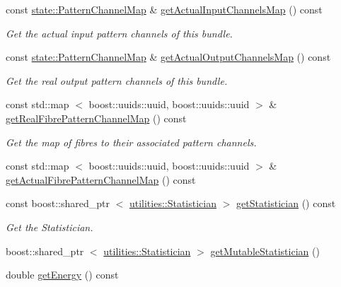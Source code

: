 \begin{DoxyCompactItemize}
const \hyperlink{classcryomesh_1_1state_1_1PatternChannelMap}{state\-::\-Pattern\-Channel\-Map} \& \hyperlink{classcryomesh_1_1structures_1_1Bundle_a65bf0246390e7cb0e90caf4fb302fa41}{get\-Actual\-Input\-Channels\-Map} () const 
\begin{DoxyCompactList}\small\item\em \-Get the actual input pattern channels of this bundle. \end{DoxyCompactList}\item 
const \hyperlink{classcryomesh_1_1state_1_1PatternChannelMap}{state\-::\-Pattern\-Channel\-Map} \& \hyperlink{classcryomesh_1_1structures_1_1Bundle_a382242e3b29b92b25edc9162aa810ebe}{get\-Actual\-Output\-Channels\-Map} () const 
\begin{DoxyCompactList}\small\item\em \-Get the real output pattern channels of this bundle. \end{DoxyCompactList}\item 
const std\-::map\*
$<$ boost\-::uuids\-::uuid, \*
boost\-::uuids\-::uuid $>$ \& \hyperlink{classcryomesh_1_1structures_1_1Bundle_a2e31be3bab4a15e4e9ba6aeac48b91df}{get\-Real\-Fibre\-Pattern\-Channel\-Map} () const 
\begin{DoxyCompactList}\small\item\em \-Get the map of fibres to their associated pattern channels. \end{DoxyCompactList}\item 
const std\-::map\*
$<$ boost\-::uuids\-::uuid, \*
boost\-::uuids\-::uuid $>$ \& \hyperlink{classcryomesh_1_1structures_1_1Bundle_a872de96a76f772182eda2abbb98a99cc}{get\-Actual\-Fibre\-Pattern\-Channel\-Map} () const 
\item 
const boost\-::shared\-\_\-ptr\*
$<$ \hyperlink{classcryomesh_1_1utilities_1_1Statistician}{utilities\-::\-Statistician} $>$ \hyperlink{classcryomesh_1_1structures_1_1Bundle_a5bfac318b9a6f9f651fad0657b9b9196}{get\-Statistician} () const 
\begin{DoxyCompactList}\small\item\em \-Get the \-Statistician. \end{DoxyCompactList}\item 
boost\-::shared\-\_\-ptr\*
$<$ \hyperlink{classcryomesh_1_1utilities_1_1Statistician}{utilities\-::\-Statistician} $>$ \hyperlink{classcryomesh_1_1structures_1_1Bundle_ae750ab1bd2b1a937f90d97e416aefced}{get\-Mutable\-Statistician} ()
\item 
double \hyperlink{classcryomesh_1_1structures_1_1Bundle_aec88635d8c4fdc76b6c3c22b915ee459}{get\-Energy} () const 

\end{DoxyCompactItemize}
